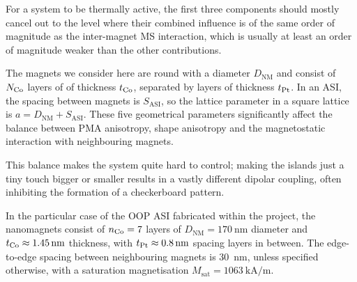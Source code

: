 For a system to be thermally active, the first three components should mostly cancel out to the level where their combined influence is of the same order of magnitude as the inter-magnet MS interaction, which is usually at least an order of magnitude weaker than the other contributions.


The magnets we consider here are round with a diameter $D_\mathrm{NM}$ and consist of $N_{\ce{Co}}$ layers of  of thickness $t_{\ce{Co}}$, separated by  layers of thickness $t_{\ce{Pt}}$.
In an ASI, the spacing between magnets is $S_\mathrm{ASI}$, so the lattice parameter in a square lattice is $a=D_\mathrm{NM}+S_\mathrm{ASI}$.
These five geometrical parameters significantly affect the balance between PMA anisotropy, shape anisotropy and the magnetostatic interaction with neighbouring magnets. \par


This balance makes the system quite hard to control; making the islands just a tiny touch bigger or smaller results in a vastly different dipolar coupling, often inhibiting the formation of a checkerboard pattern. \par
In the particular case of the OOP ASI fabricated within the \spinengine project, the nanomagnets consist of $n_{\ce{Co}}=7$  layers of $D_\mathrm{NM}=\SI{170}{\nano\metre}$ diameter and $t_{\ce{Co}} \approx \SI{1.45}{\nano\metre}$ thickness, with $t_{\ce{Pt}} \approx \SI{0.8}{\nano\metre}$ spacing layers in between.
The edge-to-edge spacing between neighbouring magnets is \SI{30}{\nano\metre}, unless specified otherwise, with a saturation magnetisation $M_\mathrm{sat}=\SI{1063}{\kilo\ampere\per\metre}$.

